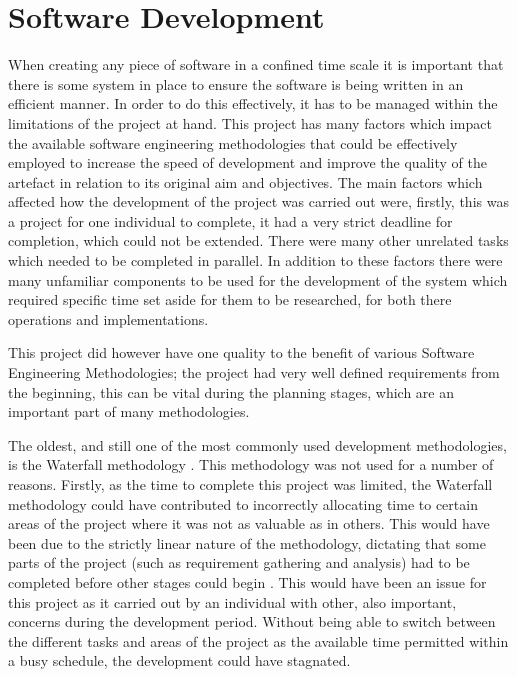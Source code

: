 \documentclass[11pt,a4paper]{report}
\begin{document}
\pagebreak

\section{Software Development}
When creating any piece of software in a confined time scale it is important that there is some system in place to ensure the software is being written in an efficient manner. In order to do this effectively, it has to be managed within the limitations of the project at hand. This project has many factors which impact the available software engineering methodologies that could be effectively employed to increase the speed of development and improve the quality of the artefact in relation to its original aim and objectives. The main factors which affected how the development of the project was carried out were, firstly, this was a project for one individual to complete, it had a very strict deadline for completion, which could not be extended. There were many other unrelated tasks which needed to be completed in parallel. In addition to these factors there were many unfamiliar components to be used for the development of the system which required specific time set aside for them to be researched, for both there operations and implementations.

This project did however have one quality to the benefit of various Software Engineering Methodologies; the project had very well defined requirements from the beginning, this can be vital during the planning stages, which are an important part of many methodologies.

The oldest, and still one of the most commonly used development methodologies, is the Waterfall methodology \citep{shaydulin2017agile}. This methodology was not used for a number of reasons. Firstly, as the time to complete this project was limited, the Waterfall methodology could have contributed to incorrectly allocating time to certain areas of the project where it was not as valuable as in others. This would have been due to the strictly linear nature of the methodology, dictating that some parts of the project (such as requirement gathering and analysis) had to be completed before other stages could begin \citep{shaydulin2017agile}. This would have been an issue for this project as it carried out by an individual with other, also important, concerns during the development period. Without being able to switch between the different tasks and areas of the project as the available time permitted within a busy schedule, the development could have stagnated. 
\end{document}

